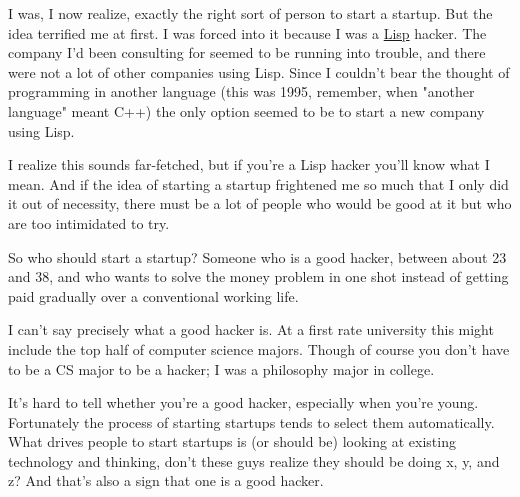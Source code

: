 I was, I now realize, exactly
                    the right sort of person to start a startup. But the idea
                    terrified me at first. I was forced into it because I was a
                    \href{http://www.paulgraham.com/icad.html}{Lisp} hacker. The company I'd been
                    consulting for seemed to be running into trouble, and there
                    were not a lot of other companies using Lisp. Since I
                    couldn't bear the thought of programming in another language
                    (this was 1995, remember, when "another language" meant C++)
                    the only option seemed to be to start a new company using
                    Lisp.

I realize this sounds far-fetched, but if
                    you're a Lisp hacker you'll know what I mean. And if the
                    idea of starting a startup frightened me so much that I only
                    did it out of necessity, there must be a lot of people who
                    would be good at it but who are too intimidated to try.

So
                    who should start a startup? Someone who is a good hacker,
                    between about 23 and 38, and who wants to solve the money
                    problem in one shot instead of getting paid gradually over a
                    conventional working life.

I can't say precisely
                    what a good hacker is. At a first rate university this might
                    include the top half of computer science majors. Though of
                    course you don't have to be a CS major to be a hacker; I was
                    a philosophy major in college.

It's hard to tell
                    whether you're a good hacker, especially when you're young.
                    Fortunately the process of starting startups tends to select
                    them automatically. What drives people to start startups is
                    (or should be) looking at existing technology and thinking,
                    don't these guys realize they should be doing x, y, and z?
                    And that's also a sign that one is a good hacker.

